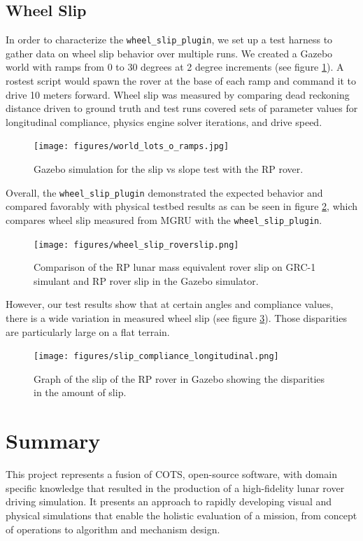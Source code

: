 \documentclass[twocolumn,letterpaper]{IEEEAerospaceCLS}  %
\begin{document}
\subsection{Wheel Slip}
In order to characterize the \texttt{wheel\_slip\_plugin}, we set up a test harness to gather data on wheel slip behavior over multiple runs. 
We created a Gazebo world with ramps from 0 to 30 degrees at 2 degree increments (see figure \ref{fig:simulationramps}). 
A rostest script would spawn the rover at the base of each ramp and command it to drive 10 meters forward.
Wheel slip was measured by comparing dead reckoning distance driven to ground truth and test runs covered sets of parameter values for longitudinal compliance, physics engine solver iterations, and drive speed. 
\begin{figure}[h!]
	\texttt{[image: figures/world\_lots\_o\_ramps.jpg]}
   	\caption{Gazebo simulation for the slip vs slope test with the RP rover.}
    \label{fig:simulationramps}
\end{figure}
Overall, the \texttt{wheel\_slip\_plugin} demonstrated the expected behavior and compared favorably with physical testbed results as can be seen in figure \ref{fig:wheelsliptuningchart}, which compares wheel slip measured from MGRU with the  \texttt{wheel\_slip\_plugin}. 
\begin{figure}[h!]
	\texttt{[image: figures/wheel\_slip\_roverslip.png]}
   	\caption{Comparison of the RP lunar mass equivalent rover slip on GRC-1 simulant and RP rover slip in the Gazebo simulator.}
    \label{fig:wheelsliptuningchart}
\end{figure}

However, our test results show that at certain angles and compliance values, there is a wide variation in measured wheel slip (see figure \ref{fig:slipdisparities}). Those disparities are particularly large on a flat terrain.
\begin{figure}[h!]
	\texttt{[image: figures/slip\_compliance\_longitudinal.png]}
   	\caption{Graph of the slip of the RP rover in Gazebo showing the disparities in the amount of slip.}
    \label{fig:slipdisparities}
\end{figure}

\section{Summary}

This project represents a fusion of COTS, open-source software, with domain specific knowledge that resulted in the production of a high-fidelity lunar rover driving simulation. 
It presents an approach to rapidly developing visual and physical simulations that enable the holistic evaluation of a mission, from concept of operations to algorithm and mechanism design.
\end{document}
